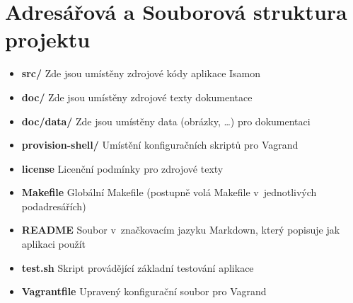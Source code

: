 \documentclass[a4paper,11pt,onecolumn,notitlepage]{article}
\begin{document}
\newpage
\section{Adresářová a Souborová struktura projektu}
\begin{itemize}
\item \textbf{src/} Zde jsou umístěny zdrojové kódy aplikace Isamon
\item \textbf{doc/} Zde jsou umístěny zdrojové texty dokumentace
\item \textbf{doc/data/} Zde jsou umístěny data (obrázky, \dots) pro dokumentaci
\item \textbf{provision-shell/} Umístění konfiguračních skriptů pro Vagrand
\item \textbf{license} Licenční podmínky pro zdrojové texty
\item \textbf{Makefile} Globální Makefile (postupně volá Makefile v~jednotlivých podadresářích)
\item \textbf{README} Soubor v~značkovacím jazyku Markdown, který popisuje jak aplikaci použít
\item \textbf{test.sh} Skript provádějící základní testování aplikace
\item \textbf{Vagrantfile} Upravený konfigurační soubor pro Vagrand
\end{itemize}

\newpage




\newpage
\end{document}
